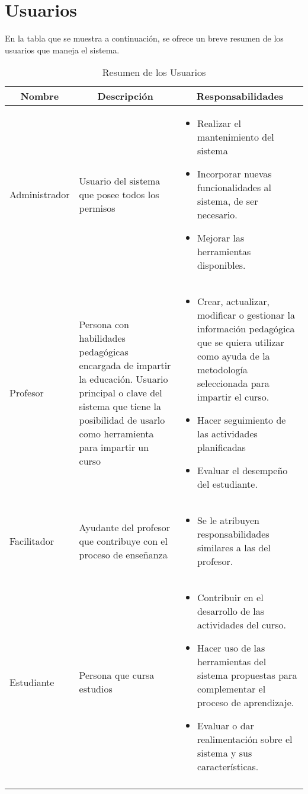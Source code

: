 \section{Usuarios}
En la tabla que se muestra a continuación, se ofrece un breve resumen de los usuarios que maneja el sistema.
\begin{longtable}{p{}p{}p{}}
	\multicolumn{1}{c}{\textbf{Nombre}} &
	\multicolumn{1}{c}{\textbf{Descripción}} &
	\multicolumn{1}{c}{\textbf{Responsabilidades}} \\ \hline
\endhead \endfoot

	Administrador
	&
	Usuario del sistema que posee todos los permisos
	&
	\vspace{-0.7cm}
	\begin{itemize}
		\item Realizar el mantenimiento del sistema
		\item Incorporar nuevas funcionalidades al sistema, de ser necesario.
		\item Mejorar las herramientas disponibles.
	\end{itemize}
	\\ \hline	
	Profesor
	&
	Persona con habilidades pedagógicas encargada de impartir
	la educación. Usuario principal o clave del sistema que 
	tiene la posibilidad de usarlo como herramienta para impartir un curso
	&
	\begin{itemize}
		\item Crear, actualizar, modificar o gestionar la información pedagógica que se quiera utilizar como ayuda de la metodología seleccionada para impartir el curso.
		\item Hacer seguimiento de las actividades planificadas
		\item Evaluar el desempeño del estudiante.
	\end{itemize}
	\\ \hline	
	Facilitador
	&
	Ayudante del profesor que contribuye con el proceso de enseñanza
	&
	\begin{itemize}
		\item Se le atribuyen responsabilidades similares a las del profesor.
	\end{itemize}
	\\ \hline	
	Estudiante
	&
	Persona que cursa estudios
	&
	\begin{itemize}
		\item Contribuir en el desarrollo de las actividades del curso.
		\item Hacer uso de las herramientas del sistema propuestas para complementar el proceso de aprendizaje.
		\item Evaluar o dar realimentación sobre el sistema y sus características.
	\end{itemize}
	\\ \hline
	\caption{Resumen de los Usuarios} \label{tab:usuarios} \\  
\end{longtable}